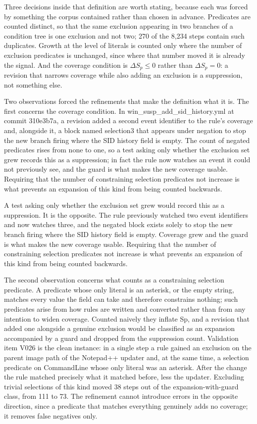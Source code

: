 Three decisions inside that definition are worth stating, because each was forced by something the corpus contained rather than chosen in advance. Predicates are counted distinct, so that the same exclusion appearing in two branches of a condition tree is one exclusion and not two; 270 of the 8,234 steps contain such duplicates. Growth at the level of literals is counted only where the number of exclusion predicates is unchanged, since where that number moved it is already the signal. And the coverage condition is ${\Delta S_{p} \leq 0}$ rather than ${\Delta S_{p} = 0}$: a revision that narrows coverage while also adding an exclusion is a suppression, not something else.

Two observations forced the refinements that make the definition what it is. The first concerns the coverage condition. In win\_susp\_add\_sid\_history.yml at commit 310e3b7a, a revision added a second event identifier to the rule's coverage and, alongside it, a block named selection3 that appears under negation to stop the new branch firing where the SID history field is empty. The count of negated predicates rises from none to one, so a test asking only whether the exclusion set grew records this as a suppression; in fact the rule now watches an event it could not previously see, and the guard is what makes the new coverage usable. Requiring that the number of constraining selection predicates not increase is what prevents an expansion of this kind from being counted backwards.

A test asking only whether the exclusion set grew would record this as a suppression. It is the opposite. The rule previously watched two event identifiers and now watches three, and the negated block exists solely to stop the new branch firing where the SID history field is empty. Coverage grew and the guard is what makes the new coverage usable. Requiring that the number of constraining selection predicates not increase is what prevents an expansion of this kind from being counted backwards.

The second observation concerns what counts as a constraining selection predicate. A predicate whose only literal is an asterisk, or the empty string, matches every value the field can take and therefore constrains nothing; such predicates arise from how rules are written and converted rather than from any intention to widen coverage. Counted naively they inflate Sp, and a revision that added one alongside a genuine exclusion would be classified as an expansion accompanied by a guard and dropped from the suppression count. Validation item V026 is the clean instance: in a single step a rule gained an exclusion on the parent image path of the Notepad++ updater and, at the same time, a selection predicate on CommandLine whose only literal was an asterisk. After the change the rule matched precisely what it matched before, less the updater. Excluding trivial selections of this kind moved 38 steps out of the expansion-with-guard class, from 111 to 73. The refinement cannot introduce errors in the opposite direction, since a predicate that matches everything genuinely adds no coverage; it removes false negatives only.

